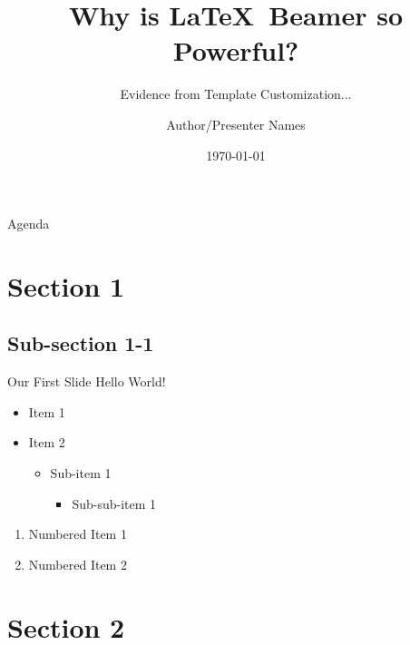 \documentclass{beamer}
\title[Footer - put anything (or nothing) here]{Why is \LaTeX \ Beamer so Powerful?}
\subtitle{Evidence from Template Customization...}
\author[Short Author Name]{Author/Presenter Names}
\institute[Monash Uni]{Department of Banking and Finance, Monash Business School}
\date{\today}
\begin{document}
\begin{frame}
  \titlepage
\end{frame}

\begin{frame}{Agenda}
  \tableofcontents
\end{frame}


\section{Section 1}

\subsection{Sub-section 1-1}

\begin{frame}{Our First Slide}
  Hello World!
  \vspace{\baselineskip}
  \vspace{\baselineskip}

  \begin{itemize}
    \item Item 1
    \item Item 2
          \begin{itemize}
            \item Sub-item 1
                  \begin{itemize}
                    \item Sub-sub-item 1
                  \end{itemize}
          \end{itemize}
  \end{itemize}

  \begin{enumerate}
    \item Numbered Item 1
    \item Numbered Item 2
  \end{enumerate}
\end{frame}

\section{Section 2}
\end{document}
